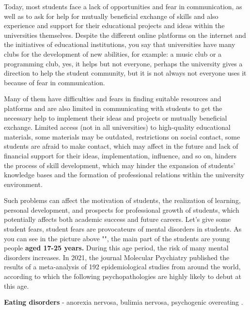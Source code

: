 \vspace{0.5cm}
\justifying
\hspace*{1cm} Today, most students face a lack of opportunities and fear in communication, as well as to ask for help for mutually beneficial exchange of skills and also experience and support for their educational projects and ideas within the universities themselves. Despite the different online platforms on the internet and the initiatives of educational institutions, you say that universities have many clubs for the development of new abilities, for example: a music club or a programming club, yes, it helps but not everyone, perhaps the university gives a direction to help the student community, but it is not always not everyone uses it because of fear in communication. 
\par
\vspace{0.5cm}
Many of them have difficulties and fears in finding suitable resources and platforms and are also limited in communicating with students to get the necessary help to implement their ideas and projects or mutually beneficial exchange.  
\newpage
Limited access (not in all universities) to high-quality educational materials, some materials may be outdated, restrictions on social contact, some students are afraid to make contact, which may affect in the future and lack of financial support for their ideas, implementation, influence, and so on, hinders the process of skill development, which may hinder the expansion of students' knowledge bases and the formation of professional relations within the university environment. 
\par
\vspace{0.5cm}
Such problems can affect the motivation of students, the realization of learning, personal development, and prospects for professional growth of students, which potentially affects both academic success and future careers.
Let's give some student fears, student fears are provocateurs of mental disorders in students.
As you can see in the picture above "", the main part of the students are young people \textbf{aged 17-25 years.} During this age period, the risk of many mental disorders increases. 
In 2021, the journal Molecular Psychiatry \cite{student-fears} published the results of a meta-analysis of 192 epidemiological studies from around the world, according to which the following psychopathologies are highly likely to debut at this age.

\par
\vspace{0.5cm}
\textbf{Eating disorders} - anorexia nervosa, bulimia nervosa, psychogenic overeating \cite{student-fears}.

